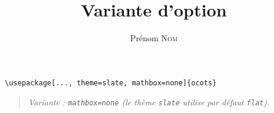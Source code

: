 \documentclass[11pt]{ocots-book}
\title{Variante d'option}
\author{Prénom \textsc{Nom}}
\newcommand{\ocotsvariantnote}[1]{\begin{quote}\itshape Variante : #1\end{quote}}
\begin{document}
\maketitle

\begin{lstlisting}
\usepackage[..., theme=slate, mathbox=none]{ocots}
\end{lstlisting}
\ocotsvariantnote{\texttt{mathbox=none} (le th\`eme \texttt{slate} utilise par d\'efaut \texttt{flat}).}

\end{document}
